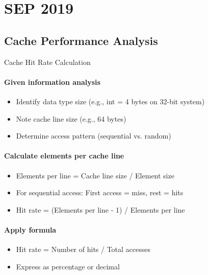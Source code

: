 \section{SEP 2019}  

\subsection{Cache Performance Analysis}

\begin{KR}{Cache Hit Rate Calculation}
    \paragraph{Given information analysis}
    \begin{itemize}
        \item Identify data type size (e.g., int = 4 bytes on 32-bit system)
        \item Note cache line size (e.g., 64 bytes)
        \item Determine access pattern (sequential vs. random)
    \end{itemize}
    
    \paragraph{Calculate elements per cache line}
    \begin{itemize}
        \item Elements per line = Cache line size / Element size
        \item For sequential access: First access = miss, rest = hits
        \item Hit rate = (Elements per line - 1) / Elements per line
    \end{itemize}
    
    \paragraph{Apply formula}
    \begin{itemize}
        \item Hit rate = Number of hits / Total accesses
        \item Express as percentage or decimal
    \end{itemize}
\end{KR}

